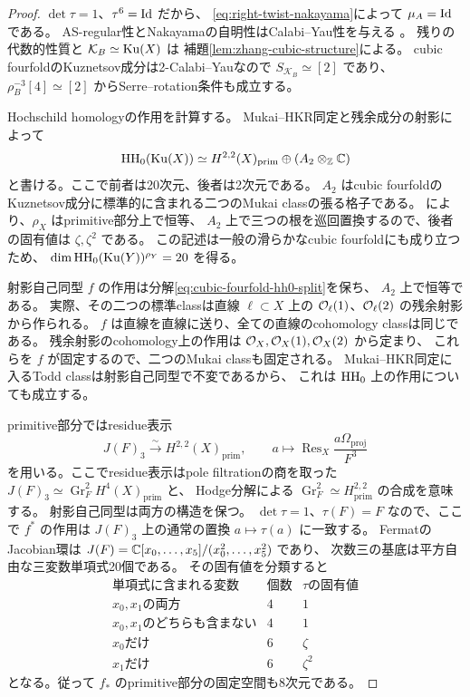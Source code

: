 \begin{proof}
 \(\det\tau=1\)、\(\tau^6=\operatorname{Id}\) だから、
 \eqref{eq:right-twist-nakayama}によって \(\mu_A=\operatorname{Id}\) である。
 AS-regular性とNakayamaの自明性はCalabi--Yau性を与える
 \cite[Lemma 1.2, Theorem 5.4]{RRZ}。
 残りの代数的性質と \(\mathcal K_B\simeq\operatorname{Ku}(X)\) は
 補題\ref{lem:zhang-cubic-structure}による。
 cubic fourfoldのKuznetsov成分は2-Calabi--Yauなので
 \(S_{\mathcal K_B}\simeq[2]\) であり、
 \(\rho_B^{-3}[4]\simeq[2]\) からSerre--rotation条件も成立する。

 Hochschild homologyの作用を計算する。
 Mukai--HKR同定と残余成分の射影によって
 \begin{equation}\label{eq:cubic-fourfold-hh0-split}
 \operatorname{HH}_0(\operatorname{Ku}(X))\simeq
 H^{2,2}(X)_{\mathrm{prim}}\oplus (A_2\otimes_{\mathbb Z}\mathbb C)
 \end{equation}
 と書ける。ここで前者は20次元、後者は2次元である。
 \(A_2\) はcubic fourfoldのKuznetsov成分に標準的に含まれる二つのMukai classの張る格子である。
 \cite[Proposition 3.12]{Huy}により、\(\rho_X\) はprimitive部分上で恒等、
 \(A_2\) 上で三つの根を巡回置換するので、後者の固有値は \(\zeta,\zeta^2\) である。
 この記述は一般の滑らかなcubic fourfoldにも成り立つため、
 \(\dim\operatorname{HH}_0(\operatorname{Ku}(Y))^{\rho_Y}=20\) を得る。

 射影自己同型 \(f\) の作用は分解\eqref{eq:cubic-fourfold-hh0-split}を保ち、
 \(A_2\) 上で恒等である。
 実際、その二つの標準classは直線 \(\ell\subset X\) 上の
 \(\mathcal O_\ell(1)\)、\(\mathcal O_\ell(2)\) の残余射影から作られる。
 \(f\) は直線を直線に送り、全ての直線のcohomology classは同じである。
 残余射影のcohomology上の作用は \(\mathcal O_X,\mathcal O_X(1),\mathcal O_X(2)\) から定まり、
 これらを \(f\) が固定するので、二つのMukai classも固定される。
 Mukai--HKR同定に入るTodd classは射影自己同型で不変であるから、
 これは \(\operatorname{HH}_0\) 上の作用についても成立する。

 primitive部分ではresidue表示
 \[
 J(F)_3\xrightarrow{\sim}H^{2,2}(X)_{\mathrm{prim}},\qquad
 a\longmapsto\operatorname{Res}_X\frac{a\Omega_{\mathrm{proj}}}{F^3}
 \]
 を用いる。ここでresidue表示はpole filtrationの商を取った
 \(J(F)_3\simeq\operatorname{Gr}_F^2H^4(X)_{\mathrm{prim}}\) と、
 Hodge分解による \(\operatorname{Gr}_F^2\simeq H^{2,2}_{\mathrm{prim}}\) の合成を意味する。
 射影自己同型は両方の構造を保つ。
 \(\det\tau=1\)、\(\tau(F)=F\) なので、ここで \(f^*\) の作用は
 \(J(F)_3\) 上の通常の置換 \(a\mapsto\tau(a)\) に一致する。
 FermatのJacobian環は \(J(F)=\mathbb C[x_0,\ldots,x_5]/(x_0^2,\ldots,x_5^2)\) であり、
 次数三の基底は平方自由な三変数単項式20個である。
 その固有値を分類すると
 \[
 \begin{array}{c|c|c}
 \text{単項式に含まれる変数}&\text{個数}&\tau\text{の固有値}\\\hline
 x_0,x_1\text{の両方}&4&1\\
 x_0,x_1\text{のどちらも含まない}&4&1\\
 x_0\text{だけ}&6&\zeta\\
 x_1\text{だけ}&6&\zeta^2
 \end{array}
 \]
 となる。従って \(f_*\) のprimitive部分の固定空間も8次元である。


\end{proof}
